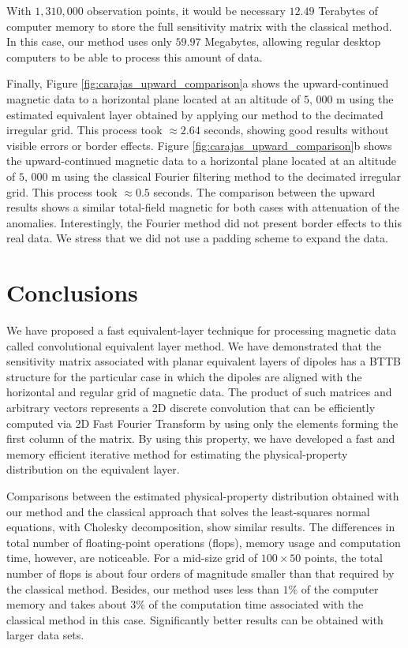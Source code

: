 \documentclass[manuscript,noblind]{geophysics}
\begin{document}
With $1,310,000$ observation points, it would be necessary $12.49$ Terabytes of computer memory to store the full
sensitivity matrix with the classical method. 
In this case, our method uses only $59.97$ Megabytes, allowing regular desktop computers to be able 
to process this amount of data.

Finally, Figure \ref{fig:carajas_upward_comparison}a shows the upward-continued magnetic data to a
horizontal plane located at an altitude of $5, \,000$ m using the estimated equivalent layer obtained by applying our
method to the decimated irregular grid. This process took $\approx 2.64$ seconds, showing good results 
without visible errors or border effects. 
Figure \ref{fig:carajas_upward_comparison}b shows the upward-continued magnetic data to a
horizontal plane located at an altitude of $5, \,000$ m using the classical Fourier filtering method to the decimated irregular grid.
This process took $\approx 0.5$ seconds.
The comparison between the upward results shows a similar total-field magnetic for both cases with attenuation of the anomalies. Interestingly, the Fourier method did not present border effects to this real data. We stress that we did not use a padding scheme to expand the data.


\section{Conclusions}

We have proposed a fast equivalent-layer technique for processing magnetic data called
convolutional equivalent layer method.
We have demonstrated that the sensitivity matrix associated with planar 
equivalent layers of dipoles has a BTTB structure for the particular case in which 
the dipoles are aligned with the horizontal and regular grid of magnetic data.
The product of such matrices and arbitrary vectors represents a 2D discrete convolution
that can be efficiently computed via 2D Fast Fourier Transform by using only the 
elements forming the first column of the matrix.
By using this property, we have developed a fast and memory efficient iterative method for 
estimating the physical-property distribution on the equivalent layer.

Comparisons between the estimated physical-property distribution obtained with our method and 
the classical approach that solves the least-squares normal equations, with Cholesky decomposition, show similar results. 
The differences in total number of floating-point operations (flops), memory usage and computation time, however, are noticeable. For a mid-size grid of $100 \times 50$ points, the total number of flops is about four orders of magnitude smaller than that required by the classical method. Besides, our method uses less than $1\%$ of the computer memory and takes about $3\%$ of the computation time associated with the classical method in this case.
Significantly better results can be obtained with larger data sets.
\end{document}

